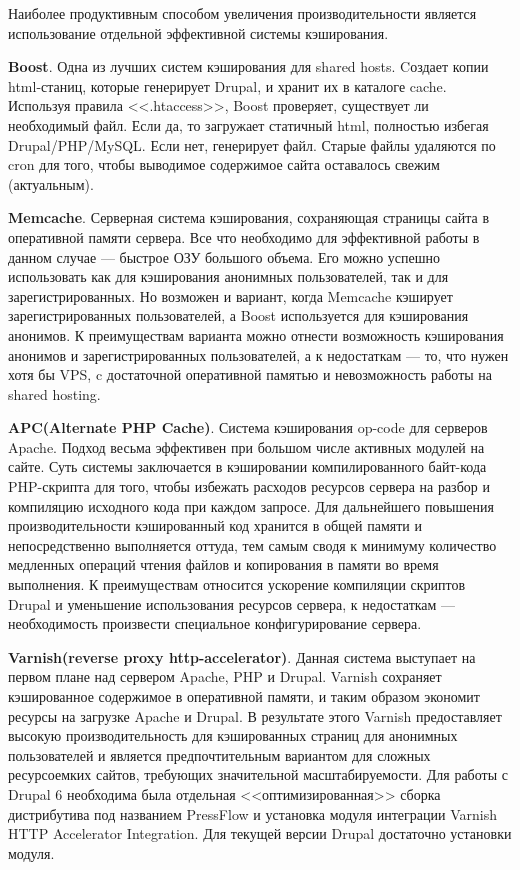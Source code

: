 \documentclass[10pt, a5paper]{article}
\begin{document}
Наиболее продуктивным способом увеличения производительности является использование отдельной  эффективной системы кэширования.

{\bf Boost}. Одна из лучших систем кэширования для shared hosts. Cоздает копии html-станиц, которые генерирует Drupal, и хранит их в каталоге cache. Используя правила <<.htaccess>>, Boost проверяет, существует ли необходимый файл. Если да, то загружает статичный html, полностью избегая Drupal/PHP/MySQL. Если нет,  генерирует файл. Старые файлы удаляются по cron для того, чтобы выводимое содержимое сайта оставалось свежим (актуальным).

{\bf Memcache}. Серверная система кэширования, сохраняющая страницы сайта в оперативной памяти сервера. Все что необходимо для эффективной работы в данном случае --- быстрое ОЗУ большого объема. Его можно успешно использовать как для кэширования анонимных пользователей, так и для зарегистрированных. Но возможен и вариант, когда Memcache кэширует зарегистрированных пользователей, а Boost используется для кэширования анонимов. К преимуществам варианта можно отнести возможность кэширования анонимов и зарегистрированных пользователей, а к недостаткам --- то, что нужен хотя бы VPS, c достаточной оперативной памятью и невозможность работы на shared hosting.

{\bf APC(Alternate PHP Cache)}. Система кэширования op-code для серверов Apache. Подход весьма эффективен при большом числе активных модулей на сайте. Суть системы заключается в кэшировании компилированного байт-кода PHP-скрипта для того, чтобы избежать расходов ресурсов сервера на разбор и компиляцию исходного кода при каждом запросе. Для дальнейшего повышения производительности кэшированный код хранится в общей памяти и непосредственно выполняется оттуда, тем самым сводя к минимуму количество медленных операций чтения файлов и копирования в памяти во время выполнения.
К преимуществам относится ускорение компиляции скриптов Drupal и уменьшение использования ресурсов сервера, к недостаткам --- необходимость произвести специальное конфигурирование сервера.

{\bf Varnish(reverse proxy http-accelerator)}. Данная система выступает на первом плане над сервером Apache, PHP и Drupal. Varnish сохраняет кэшированное содержимое в оперативной памяти, и таким образом экономит ресурсы на загрузке Apache и Drupal. В результате этого Varnish предоставляет высокую производительность для кэшированных страниц для анонимных пользователей и является предпочтительным вариантом для сложных ресурсоемких сайтов, требующих значительной  масштабируемости. Для работы с Drupal 6 необходима была отдельная <<оптимизированная>> сборка дистрибутива под названием PressFlow и установка модуля интеграции Varnish HTTP Accelerator Integration. Для текущей версии Drupal достаточно установки модуля.
\end{document}
